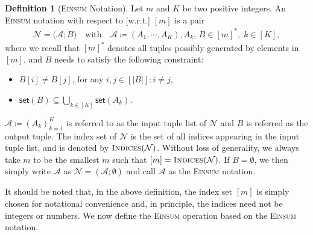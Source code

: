 \documentclass[12pt]{article}
\theoremstyle{plain}
\theoremstyle{definition}
\newtheorem{definition}{Definition}
\def\Einsum{\textsc{Einsum}}
\newcommand{\takesetp}[1]{\mathsf{set}(#1)}
\newcommand{\indexset}{\textsc{Indices}}
\def\calA{\mathcal{A}}
\def\calN{\mathcal{N}}
\begin{document}
\begin{bibunit}[agsm]
\begin{definition}[\Einsum{} Notation]\label{def:tensor_expression}
Let $m$ and $K$ be two positive integers. An \Einsum{} notation with respect to [w.r.t.] $[m]$ is a pair
\begin{align*}
\calN = \big(\calA; B\big) \quad \text{with} \quad \calA \coloneqq (A_1, \cdots, A_K), A_k,\, B \in [m]^*, \; k \in [K],
\end{align*}
where we recall that $[m]^{\ast}$ denotes all tuples possibly generated by elements in $[m]$, and $B$ needs to satisfy the following constraint: 

\begin{itemize}
    \item $B[i] \neq B[j]$, for any $i, j \in [|B|]:i \neq j$, 
    \item $\takesetp{B} \subseteq \bigcup_{k \in [K]} \takesetp{A_k}$.
\end{itemize}
$\calA \coloneqq (A_k)_{k = 1}^{K}$ is referred to as the input tuple list of $\calN$ and $B$ is referred as the output tuple. The index set of $\calN$ is the set of all indices appearing in the input tuple list, and is denoted by $\indexset(\calN)$. Without loss of generality, we always take $m$ to be the smallest $m$ such that $[m] = \indexset(\calN)$. If $B = \emptyset$, we then simply write $\calA$ as $\calN = (\calA; \emptyset)$ and call $\calA$ as the \Einsum{} notation.
\end{definition}


It should be noted that, in the above definition, the index set $[m]$ is simply chosen for notational convenience and, in principle, the indices need not be integers or numbers. We now define the \Einsum{} operation based on the \Einsum{} notation.


\end{bibunit}
\end{document}
